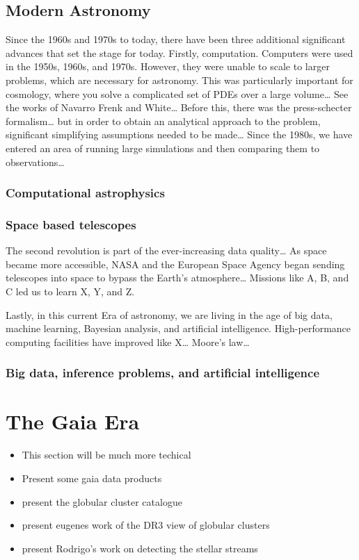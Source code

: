 \subsection{Modern Astronomy}
Since the 1960s and 1970s to today, there have been three additional significant advances that set the stage for today. Firstly, computation. Computers were used in the 1950s, 1960s, and 1970s. However, they were unable to scale to larger problems, which are necessary for astronomy. This was particularly important for cosmology, where you solve a complicated set of PDEs over a large volume… See the works of Navarro Frenk and White… Before this, there was the press-schecter formalism… but in order to obtain an analytical approach to the problem, significant simplifying assumptions needed to be made… Since the 1980s, we have entered an area of running large simulations and then comparing them to observations… 

\subsubsection*{Computational astrophysics}

\subsubsection*{Space based telescopes}

The second revolution is part of the ever-increasing data quality… As space became more accessible, NASA and the European Space Agency began sending telescopes into space to bypass the Earth's atmosphere… Missions like A, B, and C led us to learn X, Y, and Z. 


Lastly, in this current Era of astronomy, we are living in the age of big data, machine learning, Bayesian analysis, and artificial intelligence. High-performance computing facilities have improved like X… Moore's law… 


\subsubsection*{Big data, inference problems, and artificial intelligence }

\section{The Gaia Era}
    \begin{itemize}
        \item This section will be much more techical 
        \item Present some gaia data products 
        \item present the globular cluster catalogue
        \item present eugenes work of the DR3 view of globular clusters 
        \item present Rodrigo's work on detecting the stellar streams 
    \end{itemize}
